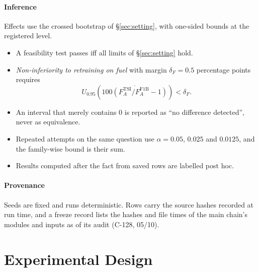 \paragraph{Inference} Effects use the crossed bootstrap of §\ref{sec:setting}, with one-sided bounds at the registered level.
\begin{itemize}\setlength\itemsep{1pt}
\item A feasibility test passes iff all limits of §\ref{sec:setting} hold.
\item \emph{Non-inferiority to retraining on fuel} with margin $\delta_F=0.5$ percentage points requires
\begin{equation}
U_{0.95}\!\left(\overline{100(F_A^{\mathrm{TSI}}/F_A^{\mathrm{F1B}}-1)}\right)<\delta_F.
\end{equation}
\item An interval that merely contains 0 is reported as ``no difference detected'', never as equivalence.
\item Repeated attempts on the same question use $\alpha=0.05$, $0.025$ and $0.0125$, and the family-wise bound is their sum.
\item Results computed after the fact from saved rows are labelled post hoc.
\end{itemize}
\paragraph{Provenance} Seeds are fixed and runs deterministic. Rows carry the source hashes recorded at run time, and a freeze record lists
the hashes and file times of the main chain's modules and inputs as of its audit (C-128, 05/10).

\section{Experimental Design}\label{sec:design}

